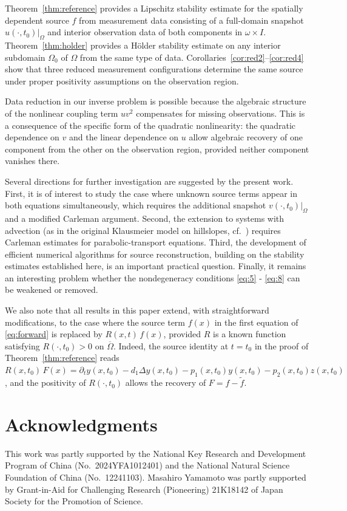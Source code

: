 \documentclass[12pt]{amsart}
\theoremstyle{plain}
\theoremstyle{definition}
\theoremstyle{remark}
\newcommand{\Om}{\Omega}
\begin{document}
Theorem~\ref{thm:reference} provides a Lipschitz stability estimate for the spatially dependent source $f$ from measurement data consisting of a
full-domain snapshot $u(\cdot,t_0)|_\Om$ and interior observation data 
of both components in $\omega\times I$.
Theorem~\ref{thm:holder} provides a H\"older stability estimate on any interior subdomain $\Om_0$ of $\Om$ from the same type of data.
Corollaries~\ref{cor:red2}--\ref{cor:red4} show that three reduced measurement configurations determine the same source under proper positivity assumptions on the observation region.

Data reduction in our inverse problem is possible because the algebraic structure of the nonlinear coupling term $uv^2$ compensates for missing observations.
This is a consequence of the specific form of the quadratic nonlinearity: the quadratic dependence on $v$ and the linear dependence on $u$ allow
algebraic recovery of one component from the other on the observation region, provided neither component vanishes there.

Several directions for further investigation are suggested by the present work. 
First, it is of interest to study the case where unknown source terms appear in both equations simultaneously, which requires the additional snapshot $v(\cdot,t_0)|_\Om$ and a modified Carleman argument.
Second, the extension to systems with advection (as in the original Klausmeier model on hillslopes, cf.\ \cite{klausmeier1999regular}) requires Carleman estimates for parabolic-transport equations.
Third, the development of efficient numerical algorithms for source reconstruction, building on the stability estimates established here,
is an important practical question.
Finally, it remains an interesting problem whether the nondegeneracy conditions \eqref{eq:5} - \eqref{eq:8} can be weakened or removed.

We also note that all results in this paper extend, with straightforward modifications, to the case where the source term $f(x)$ in the first equation of \eqref{eq:forward} is replaced by $R(x,t)\,f(x)$, provided $R$ is a known function satisfying $R(\cdot,t_0)>0$ on $\overline{\Om}$. Indeed, the source identity at $t=t_0$ in the proof of Theorem~\ref{thm:reference} reads 
$R(x,t_0)\,F(x)=\partial_t y(x,t_0)-d_1\Delta y(x,t_0)-p_1(x,t_0)y(x,t_0)
- p_2(x,t_0)z(x,t_0)$, and the positivity of $R(\cdot,t_0)$ allows 
the recovery of $F=f-\widetilde f$.

\section*{Acknowledgments}
This work was partly supported by the National Key Research and Development  Program of China (No.~2024YFA1012401) and the National Natural Science Foundation of China (No.~12241103). Masahiro Yamamoto was partly supported by Grant-in-Aid for Challenging Research (Pioneering) 21K18142 of Japan Society for the Promotion of Science.
\end{document}
